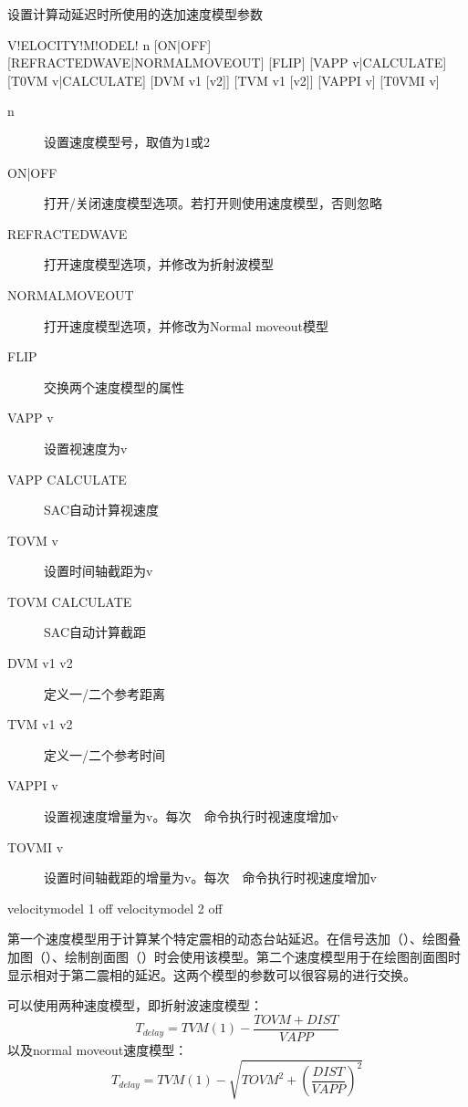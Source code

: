 \label{sss:velocitymodel}

设置计算动延迟时所使用的迭加速度模型参数

\begin{SACSTX}
V!ELOCITY!M!ODEL! n [ON|OFF] [REFRACTEDWAVE|NORMALMOVEOUT]
    [FLIP] [VAPP v|CALCULATE] [T0VM v|CALCULATE]
    [DVM v1 [v2]] [TVM v1 [v2]] [VAPPI v] [T0VMI v]
\end{SACSTX}

\begin{description}
\item [n] 设置速度模型号，取值为1或2
\item [ON|OFF] 打开/关闭速度模型选项。若打开则使用速度模型，否则忽略
\item [REFRACTEDWAVE] 打开速度模型选项，并修改为折射波模型
\item [NORMALMOVEOUT] 打开速度模型选项，并修改为Normal moveout模型
\item [FLIP] 交换两个速度模型的属性
\item [VAPP v] 设置视速度为v
\item [VAPP CALCULATE] SAC自动计算视速度
\item [TOVM v] 设置时间轴截距为v
\item [TOVM CALCULATE] SAC自动计算截距
\item [DVM v1 v2] 定义一/二个参考距离
\item [TVM v1 v2] 定义一/二个参考时间
\item [VAPPI v] 设置视速度增量为v。每次~~命令执行时视速度增加v
\item [TOVMI v] 设置时间轴截距的增量为v。每次~~命令执行时视速度增加v
\end{description}

\begin{SACDFT}
velocitymodel 1 off
velocitymodel 2 off
\end{SACDFT}

第一个速度模型用于计算某个特定震相的动态台站延迟。在信号迭加（）、绘图叠加图（）、绘制剖面图（）时会使用该模型。第二个速度模型用于在绘图剖面图时显示相对于第二震相的延迟。这两个模型的参数可以很容易的进行交换。

可以使用两种速度模型，即折射波速度模型：
\[ T_{delay} = TVM(1) - \frac{TOVM+DIST}{VAPP} \]
以及normal moveout速度模型：
\[ T_{delay} = TVM(1) - \sqrt{TOVM^2 + (\frac{DIST}{VAPP})^2} \]

